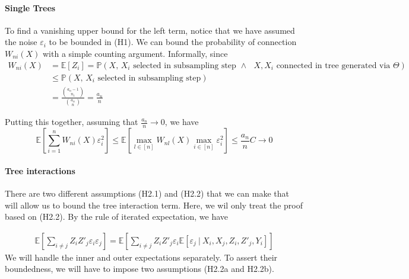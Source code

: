 \documentclass[10pt]{article}
\theoremstyle{definition}
\begin{document}
\paragraph{Single Trees} To find a vanishing upper bound for the left term,
notice that we have assumed the noise $\varepsilon_{i}$ to be bounded in (H1).
We can bound the probability of connection $W_{ni}(X)$ with a simple counting
argument. Informally, since
\begin{align*}
W_{ni}(X) &=  \mathbb{E}\left[ Z_{i} \right]  
= \mathbb{P}(\text{$X$, $X_{i}$ selected in subsampling step $\land$ $X, X_{i}$ connected in tree generated via $\Theta$}) \\
&\leq
\mathbb{P}(\text{$X$, $X_{i}$ selected in subsampling step}) \\
&= \frac{{a_{n}-1\choose n_{1}}}{{a_{n} \choose n}} = \frac{a_{n}}{n}
\end{align*}

Putting this together, assuming that  $\frac{a_n}{n} \to 0$, we have
$$
\mathbb{E}\left[ \sum_{i=1}^n W_{ni}(X) \varepsilon_{i}^2 \right] \leq
\mathbb{E}\left[ \max_{l \in [n]} W_{nl}(X) \max_{i \in [n]} \varepsilon_{i}^2
\right] \leq \frac{a_{n}}{n}C \to 0
 $$

 \paragraph{Tree interactions} There are two different assumptions (H2.1) and
 (H2.2) that we can make that will allow us to bound the tree interaction term.
 Here, we wil only treat the proof based on (H2.2). By the rule of iterated
 expectation, we have

 \begin{align}
 \mathbb{E}\left[ \sum_{i \not= j} Z_{i} Z'_{j} \varepsilon_{i} \varepsilon_{j} \right]  = 
  \mathbb{E}\left[ \sum_{i \not= j} Z_{i} Z'_{j} \varepsilon_{i} 
   \mathbb{E}\left[ \varepsilon_{j} ~|~ X_{i}, X_{j}, Z_{i}, Z'_{j}, Y_{i} \right] 
   \right]
   \label{eq:tree-interactions}
 \end{align}
We will handle the inner and outer expectations separately. To assert their
boundedness, we will have to impose two assumptions (H2.2a and H2.2b).
\end{document}

